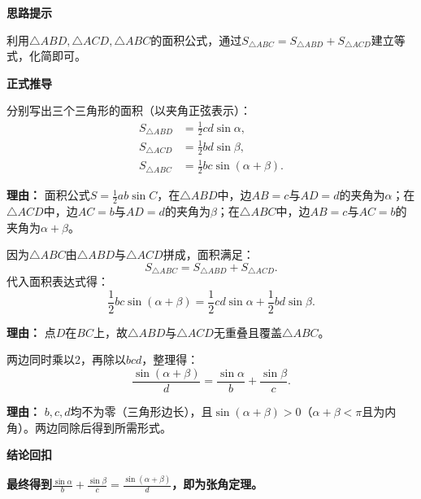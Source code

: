 \begin{proofbox}
	\textbf{\textcolor{CProof}{思路提示}}

	利用$\triangle ABD,\triangle ACD,\triangle ABC$的面积公式，通过$S_{\triangle ABC}=S_{\triangle ABD}+S_{\triangle ACD}$建立等式，化简即可。

	\medskip
	\textbf{\textcolor{CProof}{正式推导}}
	\begin{description}[style=nextline, leftmargin=2.8em, labelsep=0.5em, itemsep=0.55em]
		\item[\textbf{步骤一(书写面积):}] 分别写出三个三角形的面积（以夹角正弦表示）：
			\[
				\begin{aligned}
					S_{\triangle ABD} &= \frac{1}{2} c d \sin\alpha, \\
					S_{\triangle ACD} &= \frac{1}{2} b d \sin\beta, \\
					S_{\triangle ABC} &= \frac{1}{2} b c \sin(\alpha+\beta).
			\end{aligned}
			\]
			\par\textbf{理由：} 面积公式$S=\frac12 ab\sin C$，在$\triangle ABD$中，边$AB=c$与$AD=d$的夹角为$\alpha$；在$\triangle ACD$中，边$AC=b$与$AD=d$的夹角为$\beta$；在$\triangle ABC$中，边$AB=c$与$AC=b$的夹角为$\alpha+\beta$。

		\item[\textbf{步骤二(面积相等):}] 因为$\triangle ABC$由$\triangle ABD$与$\triangle ACD$拼成，面积满足：
			\[
				S_{\triangle ABC}=S_{\triangle ABD}+S_{\triangle ACD}.
			\]
			代入面积表达式得：
			\[
				\frac{1}{2} b c \sin(\alpha+\beta)=\frac{1}{2} c d \sin\alpha+\frac{1}{2} b d \sin\beta.
			\]
			\par\textbf{理由：} 点$D$在$BC$上，故$\triangle ABD$与$\triangle ACD$无重叠且覆盖$\triangle ABC$。

		\item[\textbf{步骤三(化简结论):}] 两边同时乘以2，再除以$b c d$，整理得：
			\[
				\frac{\sin(\alpha+\beta)}{d}=\frac{\sin\alpha}{b}+\frac{\sin\beta}{c}.
			\]
			\par\textbf{理由：} $b,c,d$均不为零（三角形边长），且$\sin(\alpha+\beta)>0$（$\alpha+\beta<\pi$且为内角）。两边同除后得到所需形式。
	\end{description}

	\medskip
	\textbf{\textcolor{CProof}{结论回扣}}

	\textbf{最终得到$\displaystyle\frac{\sin\alpha}{b}+\frac{\sin\beta}{c}=\frac{\sin(\alpha+\beta)}{d}$，即为张角定理。}
\end{proofbox}
